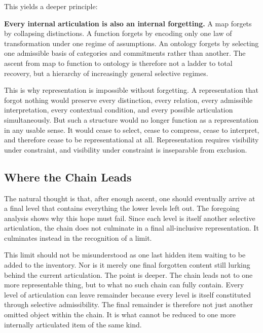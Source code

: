 \documentclass[11pt,a4paper]{article}
\newenvironment{keybox}[1]{%
  \Needspace*{8\baselineskip}%
  \begin{tcolorbox}[
    enhanced,
    breakable=false,
    colback=blue!5,
    colframe=blue!45!black,
    coltitle=black,
    colbacktitle=blue!14,
    boxrule=0.85pt,
    arc=2.5pt,
    left=9pt, right=9pt, top=6pt, bottom=6pt,
    titlerule=0.55pt,
    fonttitle=\bfseries,
    title={#1},
    before upper=\raggedright,
    before skip=0.9\baselineskip,
    after skip=0.9\baselineskip
  ]%
}{%
  \end{tcolorbox}%
}
\theoremstyle{plain}
\theoremstyle{definition}
\theoremstyle{remark}
\begin{document}
This yields a deeper principle:

\begin{keybox}{Every internal articulation forgets}
\textbf{Every internal articulation is also an internal forgetting.} A map forgets by collapsing distinctions. A function forgets by encoding only one law of transformation under one regime of assumptions. An ontology forgets by selecting one admissible basis of categories and commitments rather than another. The ascent from map to function to ontology is therefore not a ladder to total recovery, but a hierarchy of increasingly general selective regimes.
\end{keybox}

This is why representation is impossible without forgetting. A representation that forgot nothing would preserve every distinction, every relation, every admissible interpretation, every contextual condition, and every possible articulation simultaneously. But such a structure would no longer function as a representation in any usable sense. It would cease to select, cease to compress, cease to interpret, and therefore cease to be representational at all. Representation requires visibility under constraint, and visibility under constraint is inseparable from exclusion.

\subsection{Where the Chain Leads}

The natural thought is that, after enough ascent, one should eventually arrive at a final level that contains everything the lower levels left out. The foregoing analysis shows why this hope must fail. Since each level is itself another selective articulation, the chain does not culminate in a final all-inclusive representation. It culminates instead in the recognition of a limit.

This limit should not be misunderstood as one last hidden item waiting to be added to the inventory. Nor is it merely one final forgotten content still lurking behind the current articulation. The point is deeper. The chain leads not to one more representable thing, but to what no such chain can fully contain. Every level of articulation can leave remainder because every level is itself constituted through selective admissibility. The final remainder is therefore not just another omitted object within the chain. It is what cannot be reduced to one more internally articulated item of the same kind.
\end{document}
